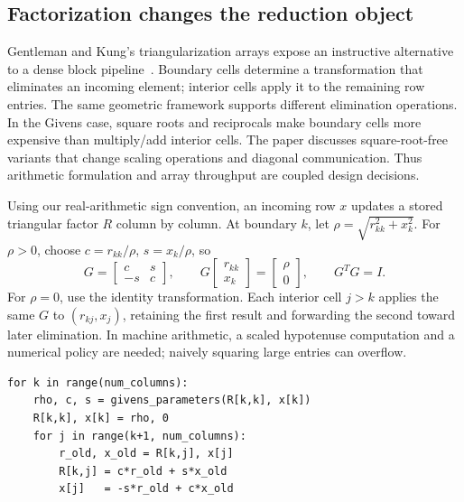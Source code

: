 \documentclass[final,3p,times,authoryear]{elsarticle}
\begin{document}
\subsection{Factorization changes the reduction object}
Gentleman and Kung's triangularization arrays expose an instructive alternative to a dense block pipeline~\citep{gentleman1982}. Boundary cells determine a transformation that eliminates an incoming element; interior cells apply it to the remaining row entries. The same geometric framework supports different elimination operations. In the Givens case, square roots and reciprocals make boundary cells more expensive than multiply/add interior cells. The paper discusses square-root-free variants that change scaling operations and diagonal communication. Thus arithmetic formulation and array throughput are coupled design decisions.

Using our real-arithmetic sign convention, an incoming row $x$ updates a stored triangular factor $R$ column by column. At boundary $k$, let $\rho=\sqrt{r_{kk}^2+x_k^2}$. For $\rho>0$, choose $c=r_{kk}/\rho$, $s=x_k/\rho$, so
\begin{equation}\label{eq:givens}
 G=\begin{bmatrix}c&s\\-s&c\end{bmatrix},\qquad
 G\begin{bmatrix}r_{kk}\\x_k\end{bmatrix}
 =\begin{bmatrix}\rho\\0\end{bmatrix},\qquad G^TG=I.
\end{equation}
For $\rho=0$, use the identity transformation. Each interior cell $j>k$ applies the same $G$ to $(r_{kj},x_j)$, retaining the first result and forwarding the second toward later elimination. In machine arithmetic, a scaled hypotenuse computation and a numerical policy are needed; naively squaring large entries can overflow.


\begin{lstlisting}[float=htbp,caption={Derived real-arithmetic state update for one row; the simultaneous use of old values is essential.}]
for k in range(num_columns):
    rho, c, s = givens_parameters(R[k,k], x[k])
    R[k,k], x[k] = rho, 0
    for j in range(k+1, num_columns):
        r_old, x_old = R[k,j], x[j]
        R[k,j] = c*r_old + s*x_old
        x[j]   = -s*r_old + c*x_old
\end{lstlisting}
\end{document}
